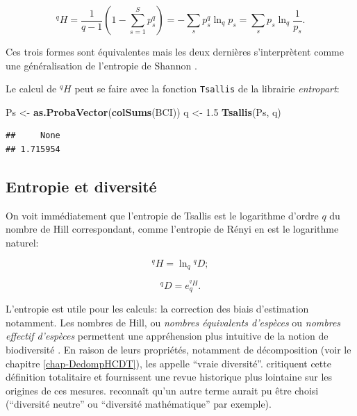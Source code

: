 \documentclass[
  11pt,
  french,
  a4paper,
  extrafontsizes,onecolumn,openright
  ]{memoir}
\newenvironment{Shaded}{\begin{snugshade}}{\end{snugshade}}
\newcommand{\FloatTok}[1]{\textcolor[rgb]{0.00,0.00,0.81}{#1}}
\newcommand{\KeywordTok}[1]{\textcolor[rgb]{0.13,0.29,0.53}{\textbf{#1}}}
\newcommand{\NormalTok}[1]{#1}
\newcommand{\StringTok}[1]{\textcolor[rgb]{0.31,0.60,0.02}{#1}}
\begin{document}
\begin{equation}
  \label{eq:EntropieHCDT}
  ^{q}\!H = \frac{1}{q-1}\left(1-\sum^S_{s=1}{p^q_s}\right)=-\sum_s{p^q_s}\ln_q{p_s}=\sum_s{p_s}\ln_q\frac{1}{p_s}.
\end{equation}

Ces trois formes sont équivalentes mais les deux dernières s'interprètent comme une généralisation de l'entropie de Shannon \autocite{Marcon2014a}.

Le calcul de \(^{q}\!H\) peut se faire avec la fonction \texttt{Tsallis} de la librairie \emph{entropart}:

\scriptsize

\begin{Shaded}
\begin{Highlighting}[]
\NormalTok{Ps <-}\StringTok{ }\KeywordTok{as.ProbaVector}\NormalTok{(}\KeywordTok{colSums}\NormalTok{(BCI))}
\NormalTok{q <-}\StringTok{ }\FloatTok{1.5}
\KeywordTok{Tsallis}\NormalTok{(Ps, q)}
\end{Highlighting}
\end{Shaded}

\begin{verbatim}
##     None 
## 1.715954
\end{verbatim}

\normalsize

\hypertarget{entropie-et-diversituxe9}{%
\subsection{Entropie et diversité}\label{entropie-et-diversituxe9}}

On voit immédiatement que l'entropie de Tsallis est le logarithme d'ordre \(q\) du nombre de Hill correspondant, comme l'entropie de Rényi en est le logarithme naturel:

\begin{equation}
  \label{eq:HlnD}
  ^{q}\!H = \ln_q{^{q}\!D};
\end{equation}

\begin{equation}
  \label{eq:DexpH}
  ^{q}\!D = e_q^{^{q}\!H}.
\end{equation}

L'entropie est utile pour les calculs: la correction des biais d'estimation notamment.
Les nombres de Hill, ou \emph{nombres équivalents d'espèces} ou \emph{nombres effectif d'espèces} permettent une appréhension plus intuitive de la notion de biodiversité \autocite{Jost2006}.
En raison de leurs propriétés, notamment de décomposition (voir le chapitre \ref{chap-DedompHCDT}), \textcite{Jost2007} les appelle \enquote{vraie diversité}.
\textcite{Hoffmann2008} critiquent cette définition totalitaire et fournissent une revue historique plus lointaine sur les origines de ces mesures.
\textcite{Jost2009} reconnaît qu'un autre terme aurait pu être choisi (\enquote{diversité neutre} ou \enquote{diversité mathématique} par exemple).
\end{document}
